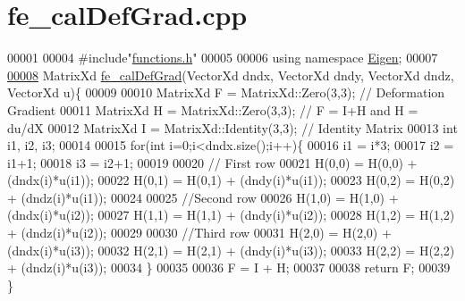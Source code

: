 \hypertarget{fe__cal_def_grad_8cpp_source}{}\section{fe\+\_\+cal\+Def\+Grad.\+cpp}
\label{fe__cal_def_grad_8cpp_source}

\begin{DoxyCode}
00001 
00004 \textcolor{preprocessor}{#include"\hyperlink{functions_8h}{functions.h}"}
00005 
00006 \textcolor{keyword}{using namespace }\hyperlink{namespace_eigen}{Eigen};
00007 
\hyperlink{fe__cal_def_grad_8cpp_ae50379f74802347e04dbc022897f9cb0}{00008} MatrixXd \hyperlink{fe__cal_def_grad_8cpp_ae50379f74802347e04dbc022897f9cb0}{fe\_calDefGrad}(VectorXd dndx, VectorXd dndy, VectorXd dndz, VectorXd u)\{
00009 
00010     MatrixXd F = MatrixXd::Zero(3,3); \textcolor{comment}{// Deformation Gradient}
00011     MatrixXd H = MatrixXd::Zero(3,3); \textcolor{comment}{// F  = I+H and H = du/dX}
00012     MatrixXd I = MatrixXd::Identity(3,3); \textcolor{comment}{// Identity Matrix}
00013     \textcolor{keywordtype}{int} i1, i2, i3;
00014 
00015     \textcolor{keywordflow}{for}(\textcolor{keywordtype}{int} i=0;i<dndx.size();i++)\{
00016         i1 = i*3;
00017         i2 = i1+1;
00018         i3 = i2+1;
00019 
00020         \textcolor{comment}{// First row}
00021         H(0,0) = H(0,0) + (dndx(i)*u(i1));
00022         H(0,1) = H(0,1) + (dndy(i)*u(i1));
00023         H(0,2) = H(0,2) + (dndz(i)*u(i1));
00024 
00025         \textcolor{comment}{//Second row}
00026         H(1,0) = H(1,0) + (dndx(i)*u(i2));
00027         H(1,1) = H(1,1) + (dndy(i)*u(i2));
00028         H(1,2) = H(1,2) + (dndz(i)*u(i2));
00029 
00030         \textcolor{comment}{//Third row}
00031         H(2,0) = H(2,0) + (dndx(i)*u(i3));
00032         H(2,1) = H(2,1) + (dndy(i)*u(i3));
00033         H(2,2) = H(2,2) + (dndz(i)*u(i3));
00034     \}
00035 
00036     F = I + H;
00037 
00038     \textcolor{keywordflow}{return} F;
00039 \}
\end{DoxyCode}
